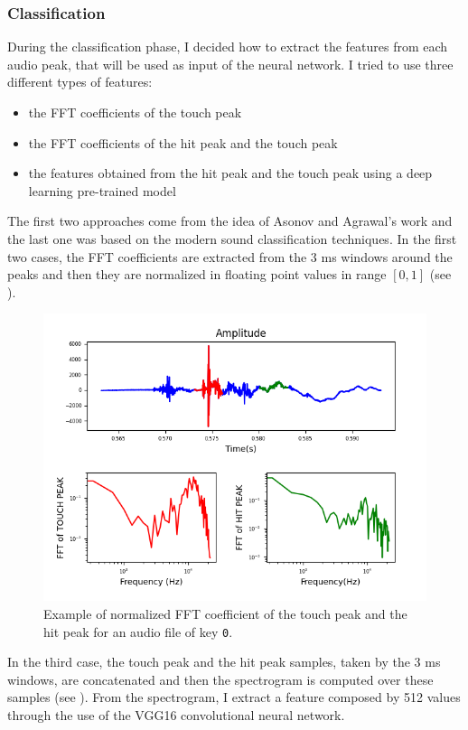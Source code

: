 \subsubsection{Classification}\label{AcCAPPCHA:classification}
During the classification phase, I decided how to extract the features from each audio peak, that will be used as input of the neural network. I tried to use three different types of features:
\begin{itemize}
\item{the FFT coefficients of the touch peak}
\item{the FFT coefficients of the hit peak and the touch peak}
\item{the features obtained from the hit peak and the touch peak using a deep learning pre-trained model}
\end{itemize}
The first two approaches come from the idea of Asonov and Agrawal's work and the last one was based on the modern sound classification techniques. In the first two cases, the  FFT coefficients are extracted from the 3 ms windows around the peaks and then they are normalized in floating point values in range $[0, 1]$ (see ).
\begin{figure}[H]
     \centering
     \includegraphics[width=.9\linewidth]{Images/AcCAPPCHA/feature_example}
     \caption{\footnotesize{Example of normalized FFT coefficient of the touch peak and the hit peak for an audio file of key \texttt{0}.}}\label{AcCAPPCHA:feature_example}
\end{figure}
In the third case, the touch peak and the hit peak samples, taken by the 3 ms windows, are concatenated and then the spectrogram is computed over these samples (see ). From the spectrogram, I extract a feature composed by 512 values through the use of the VGG16 convolutional neural network.
